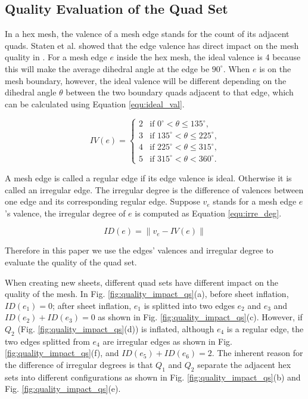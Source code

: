 \documentclass[final,5p,times,twocolumn]{elsarticle}
\begin{document}
\subsection{Quality Evaluation of the Quad Set}
\label{sec:quality_eval_qs}
In a hex mesh, the valence of a mesh edge stands for the count of its adjacent quads. Staten et al. showed that the edge valence has direct impact on the mesh quality in \cite{Staten2010d}. For a mesh edge $e$ inside the hex mesh, the ideal valence is 4 because this will make the average dihedral angle at the edge be $90^{\circ}$. When $e$ is on the mesh boundary, however, the ideal valence will be different depending on the dihedral angle $\theta$ between the two boundary quads adjacent to that edge, which can be calculated using Equation \ref{equ:ideal_val}.

\begin{equation}
\label{equ:ideal_val}
IV(e) =
 \begin{cases}
    2 & \text{if $0^{\circ} < \theta \leq 135^{\circ}$,} \\
    3 & \text{if $135^{\circ} < \theta \leq 225^{\circ}$,} \\
    4 & \text{if $225^{\circ} < \theta \leq 315^{\circ}$,} \\
    5 & \text{if $315^{\circ} < \theta < 360^{\circ}$.}
 \end{cases}
\end{equation}

A mesh edge is called a regular edge if its edge valence is ideal. Otherwise it is called an irregular edge. The irregular degree is the difference of valences between one edge and its corresponding regular edge. Suppose $v_e$ stands for a mesh edge $e$'s valence, the irregular degree of $e$ is computed as Equation \ref{equ:irre_deg}.

\begin{equation}
\label{equ:irre_deg}
ID(e) = \left \| v_e-IV(e) \right \|
\end{equation}

Therefore in this paper we use the edges' valences and irregular degree to evaluate the quality of the quad set.

When creating new sheets, different quad sets have different impact on the quality of the mesh. In Fig. \ref{fig:quality_impact_qs}(a), before sheet inflation, $ID(e_1)=0$; after sheet inflation, $e_1$ is splitted into two edges $e_2$ and $e_3$ and $ID(e_2)+ID(e_3)=0$ as shown in Fig. \ref{fig:quality_impact_qs}(c). However, if $Q_2$ (Fig. \ref{fig:quality_impact_qs}(d)) is inflated, although $e_4$ is a regular edge, the two edges splitted from $e_4$ are irregular edges as shown in Fig. \ref{fig:quality_impact_qs}(f), and $ID(e_5)+ID(e_6)=2$. The inherent reason for the difference of irregular degrees is that $Q_1$ and $Q_2$ separate the adjacent hex sets into different configurations as shown in Fig. \ref{fig:quality_impact_qs}(b) and Fig. \ref{fig:quality_impact_qs}(e).
\end{document}
